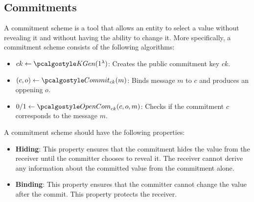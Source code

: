 \subsection{Commitments}

A commitment scheme is a tool that allows an entity to select a value without revealing it and without having the ability to change it.
More specifically, a commitment scheme consists of the following algorithms:
\begin{itemize}
    \item $ck \gets \kgen(1^\lambda)$: Creates the public commitment key $ck$.
    \item $(c,o) \gets \commit_{ck}(m)$: Binds message $m$ to $c$ and produces an oppening $o$. 
    \item $0/1 \gets \opencom_{ck}(c,o,m)$: Checks if the commitment $c$ corresponds to the message $m$.
\end{itemize}
A commitment scheme should have the following properties:
\begin{itemize}
    \item \textbf{Hiding}: This property ensures that the commitment hides the value from the receiver until the committer chooses to reveal it. The receiver cannot derive any information about the committed value from the commitment alone.
    \item \textbf{Binding}: This property ensures that the committer cannot change the value after the commit. This property protects the receiver.
\end{itemize}
